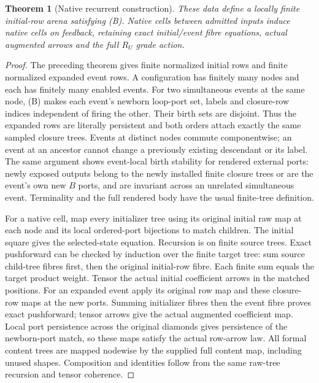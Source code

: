 \documentclass[11pt]{article}
\newtheorem{theorem}{Theorem}\newtheorem{definition}{Definition}
\begin{document}
\begin{theorem}[Native recurrent construction]
These data define a locally finite initial-row arena satisfying (B). Native cells between admitted inputs induce native cells on feedback, retaining exact initial/event fibre equations, actual augmented arrows and the full $R_U$ grade action.
\end{theorem}
\begin{proof}
The preceding theorem gives finite normalized initial rows and finite normalized expanded event rows. A configuration has finitely many nodes and each has finitely many enabled events. For two simultaneous events at the same node, (B) makes each event's newborn loop-port set, labels and closure-row indices independent of firing the other. Their birth sets are disjoint. Thus the expanded rows are literally persistent and both orders attach exactly the same sampled closure trees. Events at distinct nodes commute componentwise; an event at an ancestor cannot change a previously existing descendant or its label. The same argument shows event-local birth stability for rendered external ports: newly exposed outputs belong to the newly installed finite closure trees or are the event's own new $B$ ports, and are invariant across an unrelated simultaneous event. Terminality and the full rendered body have the usual finite-tree definition.

For a native cell, map every initializer tree using its original initial raw map at each node and its local ordered-port bijections to match children. The initial square gives the selected-state equation. Recursion is on finite source trees. Exact pushforward can be checked by induction over the finite target tree: sum source child-tree fibres first, then the original initial-row fibre. Each finite sum equals the target product weight. Tensor the actual initial coefficient arrows in the matched positions. For an expanded event apply its original row map and these closure-row maps at the new ports. Summing initializer fibres then the event fibre proves exact pushforward; tensor arrows give the actual augmented coefficient map. Local port persistence across the original diamonds gives persistence of the newborn-port match, so these maps satisfy the actual row-arrow law. All formal content trees are mapped nodewise by the supplied full content map, including unused shapes. Composition and identities follow from the same raw-tree recursion and tensor coherence.
\end{proof}
\end{document}
